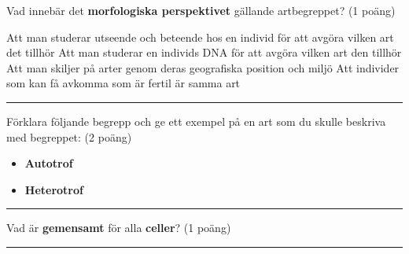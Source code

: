 \documentclass{exam}
\begin{document}
\vspace{5mm} %
\begin{center}
\end{center}
\vspace{5mm} %

\begin{questions}

\question Vad innebär det \textbf{morfologiska perspektivet} gällande artbegreppet? (1 poäng)
\begin{checkboxes}
   \choice Att man studerar utseende och beteende hos en individ för att avgöra vilken art det tillhör
   \choice Att man studerar en individs DNA för att avgöra vilken art den tillhör
   \choice Att man skiljer på arter genom deras geografiska position och miljö
   \choice Att individer som kan få avkomma som är fertil är samma art
\end{checkboxes}

\vspace{5mm} 
\hrule 
\vspace{5mm} 

\question Förklara följande begrepp och ge ett exempel på en art som du skulle beskriva med begreppet: (2 poäng) 
\begin{itemize}
     \item \textbf{Autotrof}
     \vspace{10mm} 
     \item \textbf{Heterotrof}
     \vspace{10mm} 
\end{itemize}

\vspace{5mm} 
\hrule 
\vspace{5mm} 

\question Vad är \textbf{gemensamt} för alla \textbf{celler}? (1 poäng)
\vspace{20 mm}
\vspace{5mm} 
\hrule 
\vspace{5mm} 


\end{questions}
\end{document}
